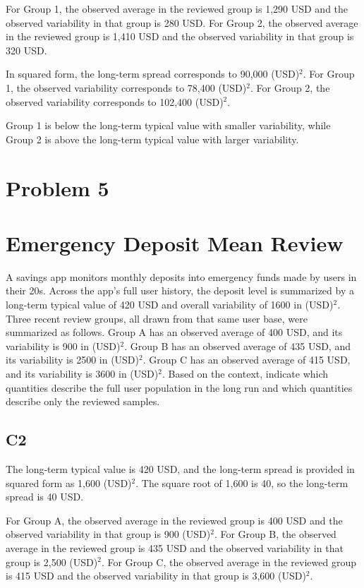 \begin{ExamProblems}
		For Group 1, the observed average in the reviewed group is 1,290 USD and the observed variability in that group is 280 USD.
		For Group 2, the observed average in the reviewed group is 1,410 USD and the observed variability in that group is 320 USD.

		In squared form, the long-term spread corresponds to 90,000 (USD)$^2$.
		For Group 1, the observed variability corresponds to 78,400 (USD)$^2$.
		For Group 2, the observed variability corresponds to 102,400 (USD)$^2$.

		Group 1 is below the long-term typical value with smaller variability, while Group 2 is above the long-term typical value with larger variability.


		\newpage
		\item
		\section{Problem 5}
		\section{Emergency Deposit Mean Review}
		A savings app monitors monthly deposits into emergency funds made by users in their 20s.
		Across the app's full user history, the deposit level is summarized by a long-term typical value of 420 USD and overall variability of 1600 in (USD)$^2$.
		Three recent review groups, all drawn from that same user base, were summarized as follows.
		Group A has an observed average of 400 USD, and its variability is 900 in (USD)$^2$.
		Group B has an observed average of 435 USD, and its variability is 2500 in (USD)$^2$.
		Group C has an observed average of 415 USD, and its variability is 3600 in (USD)$^2$.
		Based on the context, indicate which quantities describe the full user population in the long run and which quantities describe only the reviewed samples.

\subsection*{C2}
		The long-term typical value is 420 USD, and the long-term spread is provided in squared form as 1,600 (USD)$^2$.
		The square root of 1,600 is 40, so the long-term spread is 40 USD.

		For Group A, the observed average in the reviewed group is 400 USD and the observed variability in that group is 900 (USD)$^2$.
		For Group B, the observed average in the reviewed group is 435 USD and the observed variability in that group is 2,500 (USD)$^2$.
		For Group C, the observed average in the reviewed group is 415 USD and the observed variability in that group is 3,600 (USD)$^2$.


\end{ExamProblems}

